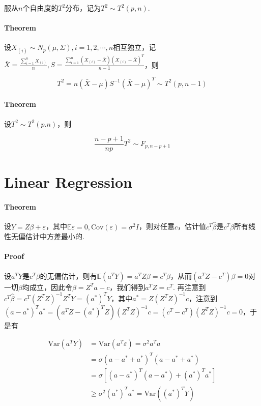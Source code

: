 \documentclass[a4paper,11pt]{article}
\begin{document}
服从$n$个自由度的$T^2$分布，记为$T^2 \sim T^2(p, n)$.

\paragraph{Theorem}
设$X_{(i)}\sim N_p(\mu, \Sigma), i=1,2,\cdots, n$相互独立，记$\bar{X} = \frac{\sum_{i=1}^nX_{(i)}}{n}, S = \frac{\sum_{i=1}^n (X_{(i)} - \bar{X})(X_{(i)} - \bar{X})^T}{n - 1}$，则

\begin{displaymath}
T^2 =n(\bar{X}-\mu)S^{-1}(\bar{X}-\mu)^T \sim T^2(p, n-1)
\end{displaymath}

\paragraph{Theorem}
设$T^2 \sim T^2(p. n)$，则

\begin{displaymath}
\frac{n - p + 1}{np}T^2 \sim F_{p, n - p + 1}
\end{displaymath}

\section{Linear Regression}
\paragraph{Theorem}
设$Y = Z\beta + \varepsilon$，其中$\mathbb{E}\varepsilon = 0, \textrm{Cov}(\varepsilon) = \sigma^2 I$，则对任意$c$，估计值$c^T\hat{\beta}$是$c^T\beta$所有线性无偏估计中方差最小的. 

\paragraph{Proof} 
设$a^TY$是$c^T\beta$的无偏估计，则有$\mathbb{E}(a^TY) = a^TZ\beta = c^T\beta$，从而$(a^TZ - c^T)\beta=0$对一切$\beta$均成立，因此令$\beta = Z^Ta - c$，我们得到$a^TZ = c^T$. 再注意到$c^T\hat{\beta} = c^T(Z^TZ)^{-1}Z^TY = (a^*)^TY$，其中$a^* = Z(Z^TZ)^{-1}c$，注意到$(a - a^*)^Ta^* = (a^TZ - (a^*)^TZ)(Z^TZ)^{-1}c = (c^T - c^T)(Z^TZ)^{-1}c =0$，于是有

\begin{displaymath}
\begin{aligned}
\textrm{Var}(a^TY) &= \textrm{Var}(a^T\varepsilon) = \sigma^2 a^Ta \\
&= \sigma (a - a^* + a^*)^T(a - a^* + a^*) \\
&= \sigma [(a - a^*)^T(a - a^*) + (a^*)^Ta^*] \\
&\geq  \sigma^2 (a^*)^Ta^* =  \textrm{Var}((a^*)^TY)
\end{aligned}
\end{displaymath}
\end{document}
